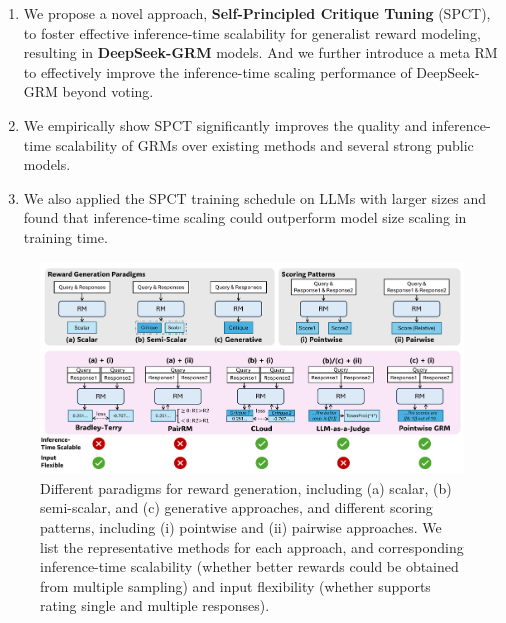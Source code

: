 \documentclass{article} %
\newcommand{\SGRMAll}{DeepSeek-GRM\xspace}
\begin{document}

\vspace{-0.5em}
\begin{enumerate}
    \setlength{\itemsep}{0em}
    \item We propose a novel approach, \textbf{Self-Principled Critique Tuning} (SPCT), to foster effective inference-time scalability for generalist reward modeling, resulting in \textbf{\SGRMAll} models. And we further introduce a meta RM to effectively improve the inference-time scaling performance of \SGRMAll beyond voting. 
    \item We empirically show SPCT significantly improves the quality and inference-time scalability of GRMs over existing methods and several strong public models. 
    \item We also applied the SPCT training schedule on LLMs with larger sizes and found that inference-time scaling could outperform model size scaling in training time. 
\end{enumerate}

\begin{figure}[t]
  \centering
  \includegraphics[width=\textwidth]{figures/fig2.pdf}
  \caption{Different paradigms for reward generation, including (a) scalar, (b) semi-scalar, and (c) generative approaches, and different scoring patterns, including (i) pointwise and (ii) pairwise approaches. We list the representative methods for each approach, and corresponding inference-time scalability (whether better rewards could be obtained from multiple sampling) and input flexibility (whether supports rating single and multiple responses).}
  \label{fig:method-comp}
  \vspace{-1em}
\end{figure}
\end{document}
